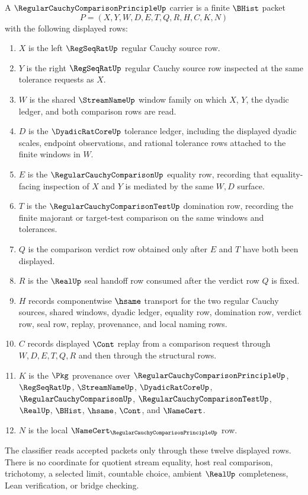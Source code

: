 \begin{definition}
\label{def:regular-cauchy-comparison-principle-carrier}
A $\RegularCauchyComparisonPrincipleUp$ carrier is a finite $\BHist$ packet
$$
P=(X,Y,W,D,E,T,Q,R,H,C,K,N)
$$
with the following displayed rows:
\begin{enumerate}
\item $X$ is the left $\RegSeqRatUp$ regular Cauchy source row.
\item $Y$ is the right $\RegSeqRatUp$ regular Cauchy source row inspected at the same tolerance requests as $X$.
\item $W$ is the shared $\StreamNameUp$ window family on which $X$, $Y$, the dyadic ledger, and both comparison rows are read.
\item $D$ is the $\DyadicRatCoreUp$ tolerance ledger, including the displayed dyadic scales, endpoint observations, and rational tolerance rows attached to the finite windows in $W$.
\item $E$ is the $\RegularCauchyComparisonUp$ equality row, recording that equality-facing inspection of $X$ and $Y$ is mediated by the same $W,D$ surface.
\item $T$ is the $\RegularCauchyComparisonTestUp$ domination row, recording the finite majorant or target-test comparison on the same windows and tolerances.
\item $Q$ is the comparison verdict row obtained only after $E$ and $T$ have both been displayed.
\item $R$ is the $\RealUp$ seal handoff row consumed after the verdict row $Q$ is fixed.
\item $H$ records componentwise $\hsame$ transport for the two regular Cauchy sources, shared windows, dyadic ledger, equality row, domination row, verdict row, seal row, replay, provenance, and local naming rows.
\item $C$ records displayed $\Cont$ replay from a comparison request through $W,D,E,T,Q,R$ and then through the structural rows.
\item $K$ is the $\Pkg$ provenance over $\RegularCauchyComparisonPrincipleUp$, $\RegSeqRatUp$, $\StreamNameUp$, $\DyadicRatCoreUp$, $\RegularCauchyComparisonUp$, $\RegularCauchyComparisonTestUp$, $\RealUp$, $\BHist$, $\hsame$, $\Cont$, and $\NameCert$.
\item $N$ is the local $\NameCert_{\RegularCauchyComparisonPrincipleUp}$ row.
\end{enumerate}
The classifier reads accepted packets only through these twelve displayed rows. There is no coordinate for quotient stream equality, host real comparison, trichotomy, a selected limit, countable choice, ambient $\RealUp$ completeness, Lean verification, or bridge checking.
\end{definition}

